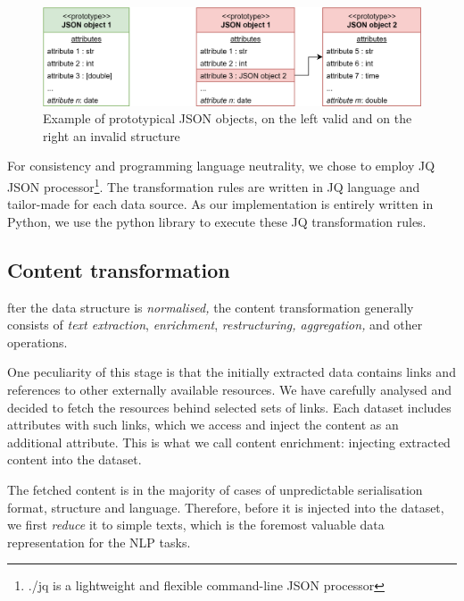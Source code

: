 \begin{Center}
\begin{figure}[H]
	\begin{Center}
		\includegraphics[width=\textwidth]{images/image1.png}
		\caption{Example of prototypical JSON objects, on the left valid and on the right an invalid structure}
		\label{fig:Example_of_prototypical_JSON_objects_on_the_left_valid_and_on_the_right_an_invalid_structure}
	\end{Center}
\end{figure}
\end{Center}

For consistency and programming language neutrality, we chose to employ JQ JSON processor\footnote{ ./jq is a lightweight and flexible command-line JSON processor }. The transformation rules are written in JQ language and tailor-made for each data source. As our implementation is entirely written in Python, we use the python library to execute these JQ transformation rules.

\subsection{Content transformation}

fter the data structure is \textit{normalised,} the content transformation generally consists of \textit{text extraction}, \textit{enrichment}, \textit{restructuring, aggregation,} and other operations. 

One peculiarity of this stage is that the initially extracted data contains links and references to other externally available resources. We have carefully analysed and decided to fetch the resources behind selected sets of links. Each dataset includes attributes with such links, which we access and inject the content as an additional attribute. This is what we call content enrichment: injecting extracted content into the dataset. 

The fetched content is in the majority of cases of unpredictable serialisation format, structure and language. Therefore, before it is injected into the dataset, we first \textit{reduce} it to simple texts, which is the foremost valuable data representation for the NLP tasks.

